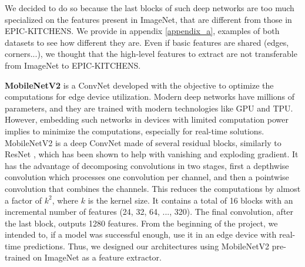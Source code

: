 \documentclass[12pt, a4paper]{report}
\begin{document}
				We decided to do so because the last blocks of such deep networks are too much specialized on the features present in ImageNet, that are different from those in EPIC-KITCHENS.
				We provide in appendix \ref{appendix_a}, examples of both datasets to see how different they are.
				Even if basic features are shared (edges, corners...), we thought that the high-level features to extract are not transferable from ImageNet to EPIC-KITCHENS.
				\par
				\textbf{MobileNetV2} \cite{sandler2019mobilenetv2} is a ConvNet developed with the objective to optimize the computations for edge device utilization.
				Modern deep networks have millions of parameters, and they are trained with modern technologies like GPU and TPU.
				However, embedding such networks in devices with limited computation power implies to minimize the computations, especially for real-time solutions.
				MobileNetV2 is a deep ConvNet made of several residual blocks, similarly to ResNet \cite{he2015deep}, which has been shown to help with vanishing and exploding gradient.
				It has the advantage of decomposing convolutions in two stages, first a depthwise convolution which processes one convolution per channel, and then a pointwise convolution that combines the channels.
				This reduces the computations by almost a factor of $k^{2}$, where $k$ is the kernel size.
				It contains a total of 16 blocks with an incremental number of features (24, 32, 64, ..., 320).
				The final convolution, after the last block, outputs 1280 features.
				From the beginning of the project, we intended to, if a model was successful enough, use it in an edge device with real-time predictions.
				Thus, we designed our architectures using MobileNetV2 pre-trained on ImageNet as a feature extractor.
\end{document}
